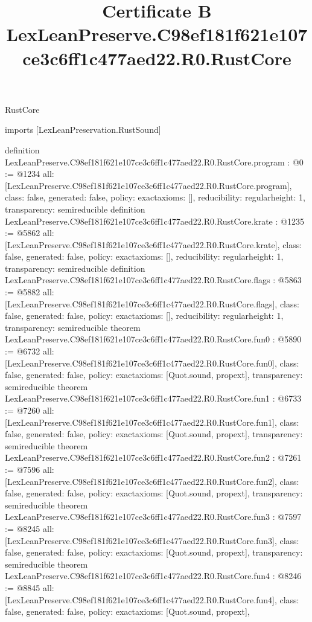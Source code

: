 \begin{lexlean}{RustCore}
\title{Certificate B LexLeanPreserve.C98ef181f621e107ce3c6ff1c477aed22.R0.RustCore}
\begin{coremodule}
imports [LexLeanPreservation.RustSound]

definition LexLeanPreserve.C98ef181f621e107ce3c6ff1c477aed22.R0.RustCore.program : @0 := @1234 {
  all: [LexLeanPreserve.C98ef181f621e107ce3c6ff1c477aed22.R0.RustCore.program],
  class: false,
  generated: false,
  policy: exact{axioms: []},
  reducibility: regular{height: 1},
  transparency: semireducible
}
definition LexLeanPreserve.C98ef181f621e107ce3c6ff1c477aed22.R0.RustCore.krate : @1235 := @5862 {
  all: [LexLeanPreserve.C98ef181f621e107ce3c6ff1c477aed22.R0.RustCore.krate],
  class: false,
  generated: false,
  policy: exact{axioms: []},
  reducibility: regular{height: 1},
  transparency: semireducible
}
definition LexLeanPreserve.C98ef181f621e107ce3c6ff1c477aed22.R0.RustCore.flags : @5863 := @5882 {
  all: [LexLeanPreserve.C98ef181f621e107ce3c6ff1c477aed22.R0.RustCore.flags],
  class: false,
  generated: false,
  policy: exact{axioms: []},
  reducibility: regular{height: 1},
  transparency: semireducible
}
theorem LexLeanPreserve.C98ef181f621e107ce3c6ff1c477aed22.R0.RustCore.fun0 : @5890 := @6732 {
  all: [LexLeanPreserve.C98ef181f621e107ce3c6ff1c477aed22.R0.RustCore.fun0],
  class: false,
  generated: false,
  policy: exact{axioms: [Quot.sound, propext]},
  transparency: semireducible
}
theorem LexLeanPreserve.C98ef181f621e107ce3c6ff1c477aed22.R0.RustCore.fun1 : @6733 := @7260 {
  all: [LexLeanPreserve.C98ef181f621e107ce3c6ff1c477aed22.R0.RustCore.fun1],
  class: false,
  generated: false,
  policy: exact{axioms: [Quot.sound, propext]},
  transparency: semireducible
}
theorem LexLeanPreserve.C98ef181f621e107ce3c6ff1c477aed22.R0.RustCore.fun2 : @7261 := @7596 {
  all: [LexLeanPreserve.C98ef181f621e107ce3c6ff1c477aed22.R0.RustCore.fun2],
  class: false,
  generated: false,
  policy: exact{axioms: [Quot.sound, propext]},
  transparency: semireducible
}
theorem LexLeanPreserve.C98ef181f621e107ce3c6ff1c477aed22.R0.RustCore.fun3 : @7597 := @8245 {
  all: [LexLeanPreserve.C98ef181f621e107ce3c6ff1c477aed22.R0.RustCore.fun3],
  class: false,
  generated: false,
  policy: exact{axioms: [Quot.sound, propext]},
  transparency: semireducible
}
theorem LexLeanPreserve.C98ef181f621e107ce3c6ff1c477aed22.R0.RustCore.fun4 : @8246 := @8845 {
  all: [LexLeanPreserve.C98ef181f621e107ce3c6ff1c477aed22.R0.RustCore.fun4],
  class: false,
  generated: false,
  policy: exact{axioms: [Quot.sound, propext]},
}
\end{coremodule}
\end{lexlean}
